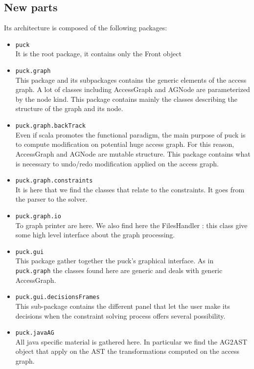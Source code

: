 \documentclass[]{article}
\begin{document}
\subsection{New parts}
Its architecture is composed of the following packages: 
\begin{itemize}
\item \verb|puck|\\
	It is the root package, it contains only the Front object

\item \verb|puck.graph|\\
	This package and its subpackages contains the generic elements of the access graph. A lot of classes including AccessGraph and AGNode are parameterized by the node kind. This package contains mainly the classes describing the structure of the graph and its node.

\item \verb|puck.graph.backTrack|\\
	Even if scala promotes the functional paradigm, the main purpose of puck is to compute modification on potential huge access graph. For this reason, AccessGraph and AGNode are mutable structure. This package contains what is necessary to undo/redo modification applied on the access graph.

\item \verb|puck.graph.constraints|\\
	It is here that we find the classes that relate to the constraints. It goes from the parser to the solver.

\item \verb|puck.graph.io|\\
	To graph printer are here. We also find here the FilesHandler : this class give some high level interface about the graph processing.

\item \verb|puck.gui|\\
	This package gather together the puck's graphical interface. As in \verb|puck.graph| the classes found here are generic and deals with generic AccessGraph.
	
\item \verb|puck.gui.decisionsFrames|\\
	This sub-package contains the different panel that let the user make its decisions when the constraint solving process offers several possibility.
	
\item \verb|puck.javaAG|\\
	All java specific material is gathered here. 
	In particular we find the AG2AST object that apply on the AST the transformations computed on the access graph.


\end{itemize}
\end{document}
